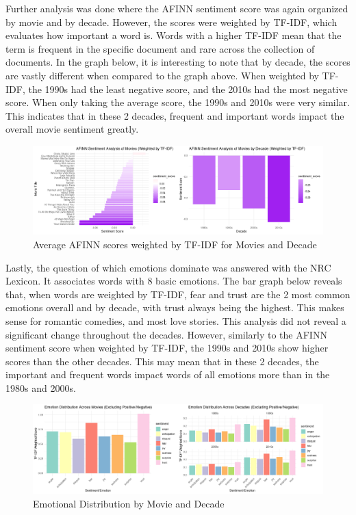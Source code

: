 \documentclass[
  authoryear,
  preprint]{elsarticle}
\begin{document}
Further analysis was done where the AFINN sentiment score was again
organized by movie and by decade. However, the scores were weighted by
TF-IDF, which evaluates how important a word is. Words with a higher
TF-IDF mean that the term is frequent in the specific document and rare
across the collection of documents. In the graph below, it is
interesting to note that by decade, the scores are vastly different when
compared to the graph above. When weighted by TF-IDF, the 1990s had the
least negative score, and the 2010s had the most negative score. When
only taking the average score, the 1990s and 2010s were very similar.
This indicates that in these 2 decades, frequent and important words
impact the overall movie sentiment greatly.

\begin{figure}[H]

{\centering \includegraphics{images/decavgtdfif-imageonline.co-merged.png}

}

\caption{Average AFINN scores weighted by TF-IDF for Movies and Decade}

\end{figure}%

Lastly, the question of which emotions dominate was answered with the
NRC Lexicon. It associates words with 8 basic emotions. The bar graph
below reveals that, when words are weighted by TF-IDF, fear and trust
are the 2 most common emotions overall and by decade, with trust always
being the highest. This makes sense for romantic comedies, and most love
stories. This analysis did not reveal a significant change throughout
the decades. However, similarly to the AFINN sentiment score when
weighted by TF-IDF, the 1990s and 2010s show higher scores than the
other decades. This may mean that in these 2 decades, the important and
frequent words impact words of all emotions more than in the 1980s and
2000s.

\begin{figure}[H]

{\centering \includegraphics{images/nrc2-imageonline.co-merged.png}

}

\caption{Emotional Distribution by Movie and Decade}

\end{figure}%
\end{document}
